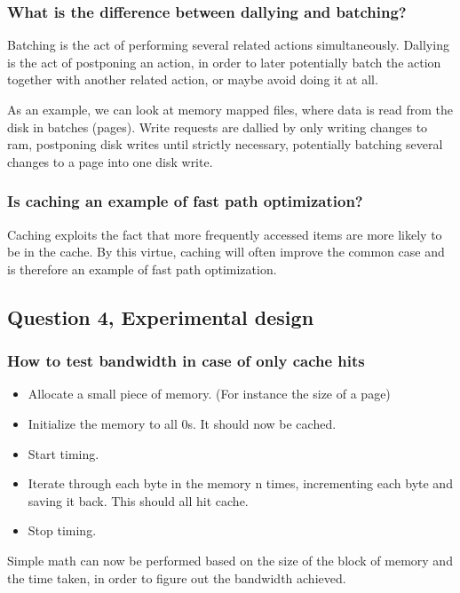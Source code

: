 \documentclass[11pt,a4paper]{article}
\begin{document}
\subsubsection{What is the difference between dallying and batching?}

Batching is the act of performing several related actions simultaneously.
Dallying is the act of postponing an action, in order to later potentially batch
the action together with another related action, or maybe avoid doing it at all.

As an example, we can look at memory mapped files, where data is read from the
disk in batches (pages).
Write requests are dallied by only writing changes to ram, postponing disk
writes until strictly necessary, potentially batching several changes to a page
into one disk write.

\subsubsection{Is caching an example of fast path optimization?}

Caching exploits the fact that more frequently accessed items are more likely
to be in the cache. By this virtue, caching will often improve the common case
and is therefore an example of fast path optimization.

\subsection{Question 4, Experimental design}
\subsubsection{How to test bandwidth in case of only cache hits}
\begin{itemize}
    \item Allocate a small piece of memory. (For instance the size of a page)
    \item Initialize the memory to all 0s. It should now be cached.
    \item Start timing.
    \item Iterate through each byte in the memory n times, incrementing each byte
          and saving it back. This should all hit cache.
    \item Stop timing.
\end{itemize}

Simple math can now be performed based on the size of the block of memory and
the time taken, in order to figure out the bandwidth achieved.
\end{document}
